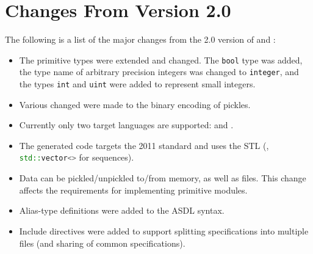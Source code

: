 \section{Changes From Version 2.0}
\label{sec:changes}

The following is a list of the major changes from the 2.0 version of \asdl{}
and \asdlgen{}:
\begin{itemize}
  \item
    The primitive types were extended and changed.
    The \lstinline!bool! type was added, the type name of arbitrary precision integers
    was changed to \lstinline!integer!, and the types \lstinline!int! and \lstinline!uint!
    were added to represent small integers.
  \item
    Various changed were made to the binary encoding of pickles.
  \item
    Currently only two target languages are supported: \sml{} and \Cplusplus{}.
  \item
    The generated \Cplusplus{} code targets the 2011 standard and uses the
    \Cplusplus{} STL (\eg{}, \lstinline[language=C++]!std::vector<>! for \asdl{} sequences).
  \item
    Data can be pickled/unpickled to/from memory, as well as files.
    This change affects the requirements for implementing primitive modules.
  \item
    Alias-type definitions were added to the ASDL syntax.
  \item
    Include directives were added to support splitting specifications into multiple
    files (and sharing of common specifications).
\end{itemize}%
